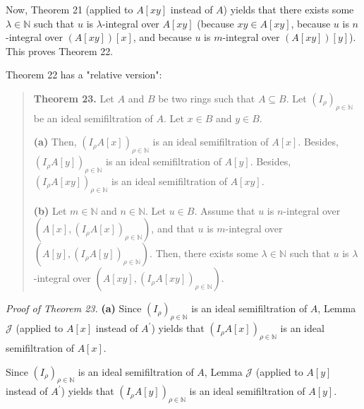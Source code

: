 \documentclass[12pt,final,notitlepage,onecolumn]{article}%
\begin{document}
Now, Theorem 21 (applied to $A\left[  xy\right]  $ instead of $A$) yields that
there exists some $\lambda\in\mathbb{N}$ such that $u$ is $\lambda$-integral
over $A\left[  xy\right]  $ (because $xy\in A\left[  xy\right]  $, because $u$
is $n$-integral over $\left(  A\left[  xy\right]  \right)  \left[  x\right]
$, and because $u$ is $m$-integral over $\left(  A\left[  xy\right]  \right)
\left[  y\right]  $). This proves Theorem 22.

Theorem 22 has a "relative version":

\begin{quote}
\textbf{Theorem 23.} Let $A$ and $B$ be two rings such that $A\subseteq B$.
Let $\left(  I_{\rho}\right)  _{\rho\in\mathbb{N}}$ be an ideal semifiltration
of $A$. Let $x\in B$ and $y\in B$.

\textbf{(a)} Then, $\left(  I_{\rho}A\left[  x\right]  \right)  _{\rho
\in\mathbb{N}}$ is an ideal semifiltration of $A\left[  x\right]  $. Besides,
$\left(  I_{\rho}A\left[  y\right]  \right)  _{\rho\in\mathbb{N}}$ is an ideal
semifiltration of $A\left[  y\right]  $. Besides, $\left(  I_{\rho}A\left[
xy\right]  \right)  _{\rho\in\mathbb{N}}$ is an ideal semifiltration of
$A\left[  xy\right]  $.

\textbf{(b)} Let $m\in\mathbb{N}$ and $n\in\mathbb{N}$. Let $u\in B$. Assume
that $u$ is $n$-integral over $\left(  A\left[  x\right]  ,\left(  I_{\rho
}A\left[  x\right]  \right)  _{\rho\in\mathbb{N}}\right)  $, and that $u$ is
$m$-integral over $\left(  A\left[  y\right]  ,\left(  I_{\rho}A\left[
y\right]  \right)  _{\rho\in\mathbb{N}}\right)  $. Then, there exists some
$\lambda\in\mathbb{N}$ such that $u$ is $\lambda$-integral over $\left(
A\left[  xy\right]  ,\left(  I_{\rho}A\left[  xy\right]  \right)  _{\rho
\in\mathbb{N}}\right)  $.
\end{quote}

\textit{Proof of Theorem 23.} \textbf{(a)} Since $\left(  I_{\rho}\right)
_{\rho\in\mathbb{N}}$ is an ideal semifiltration of $A$, Lemma $\mathcal{J}$
(applied to $A\left[  x\right]  $ instead of $A^{\prime}$) yields that
$\left(  I_{\rho}A\left[  x\right]  \right)  _{\rho\in\mathbb{N}}$ is an ideal
semifiltration of $A\left[  x\right]  $.

Since $\left(  I_{\rho}\right)  _{\rho\in\mathbb{N}}$ is an ideal
semifiltration of $A$, Lemma $\mathcal{J}$ (applied to $A\left[  y\right]  $
instead of $A^{\prime}$) yields that $\left(  I_{\rho}A\left[  y\right]
\right)  _{\rho\in\mathbb{N}}$ is an ideal semifiltration of $A\left[
y\right]  $.
\end{document}
